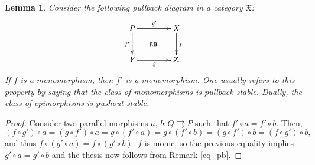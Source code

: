 \documentclass[12pt]{article}
\newtheorem{lemma}{Lemma}[section]
\theoremstyle{definition}
\def\X{\mathfrak X}
\numberwithin{equation}{section}
\begin{document}
\begin{lemma}\label{mono_are_pullback_stable}
	Consider the following pullback diagram in a category $\X$:
	\begin{equation*}
	\xymatrix@R=10pt@C=40pt{
		P\ar@{}[ddr]|-{\text{P.B.}}\ar[dd]_{f'}\ar[r]^{g'}&X\ar[dd]^f\\
		\\
		Y\ar[r]_g&Z.
	}
	\end{equation*}
	If $f$ is a monomorphism, then $f'$ is a monomorphism. One usually refers to this property by saying that the class of monomorphisms is {\em pullback-stable}. Dually, the class of epimorphisms is {\em pushout-stable}.
\end{lemma} 
\begin{proof}
	Consider two parallel morphisms $a,\, b\colon Q\rightrightarrows P$ such that $f'\circ a=f'\circ b$. Then, 
	\[
	(f\circ g')\circ a=(g\circ f')\circ a=g\circ (f'\circ a)=g\circ (f'\circ b)=(g\circ f')\circ b=(f\circ g')\circ b,
	\]
	and thus $f\circ (g'\circ a)=f\circ (g'\circ b)$. $f$ is monic, so the previous equality implies $g'\circ a=g'\circ b$ and the thesis now follows from Remark \ref{eq_pb}.
	\iffalse 
	Letting $f'':=f'\circ a\colon Q\to Y$ and $g'':=g'\circ b\colon Q\to X$ we get the following commutative diagram:
	\[
	\xymatrix@R=10pt@C=40pt{
		Q\ar@{.>}[dr]|-{\exists!\ \varphi}\ar@/_-15pt/[rrd]^{g''}\ar@/_15pt/[rddd]_{f''}\\
		&P\ar@{}[ddr]|-{\text{P.B.}}\ar[dd]_{f'}\ar[r]^{g'}&X\ar[dd]^f\\
		\\
		&Y\ar[r]_g&Z.
	}
	\]
	By the universal property of the pullback, there exists a unique $\varphi\colon Q\to P$ rendering the diagram commutative, therefore $a=\varphi=b$. 
	\fi 
\end{proof}
\end{document}
